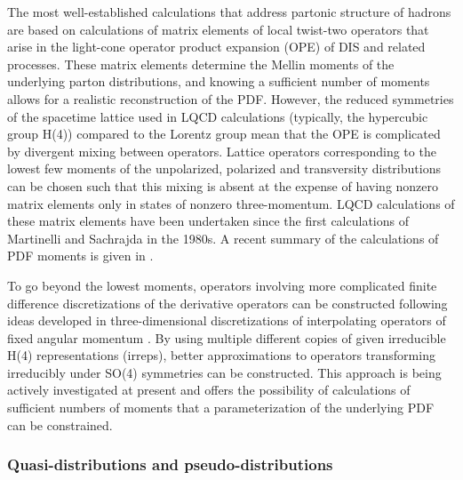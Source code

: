 The most well-established calculations that address partonic structure of hadrons are based on calculations of matrix elements of local twist-two operators that arise in the light-cone operator product expansion (OPE) of DIS and related processes. These matrix elements determine the Mellin moments of the underlying parton distributions, and knowing a sufficient number of moments allows for a realistic reconstruction of the PDF. However, the reduced symmetries of the spacetime lattice used in LQCD calculations (typically, the hypercubic group H(4)) compared to the Lorentz group mean that the OPE is complicated by divergent mixing between operators.
Lattice operators corresponding to the lowest few moments of the unpolarized, polarized and transversity distributions can be chosen such that this mixing is absent at the expense of having nonzero matrix elements only in states of nonzero three-momentum. LQCD calculations of these matrix elements have been undertaken since the first calculations of Martinelli and Sachrajda \cite{Dawson:1997ic} in the 1980s. A recent summary of the calculations of PDF moments is given in \cite{Lin:2017snn}.
	
To go beyond the lowest moments, operators involving more complicated finite difference discretizations of the derivative operators can be constructed following ideas developed in three-dimensional discretizations of interpolating operators of fixed angular momentum \cite{Davoudi:2012ya} . By using multiple different copies of given irreducible H(4) representations (irreps), better approximations to operators transforming irreducibly under SO(4) symmetries can be constructed. This approach is being actively investigated at present and offers the possibility of calculations of sufficient numbers of moments that a parameterization of the underlying PDF can be constrained.



\subsubsection{Quasi-distributions and pseudo-distributions}



 

